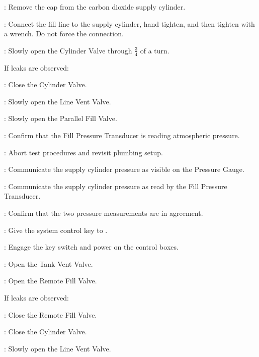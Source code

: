\begin{checklist}
    \item \primary: Remove the cap from the carbon dioxide supply cylinder.
    \item \primary: Connect the fill line to the supply cylinder, hand tighten, and then tighten with a wrench. Do not force the connection.
    \item \primary: Slowly open the Cylinder Valve through $\frac{3}{4}$ of a turn.
    \begin{checklist}[label=$\bullet$]
        \item If leaks are observed:
        \begin{checklist}
            \item \primary{}: Close the Cylinder Valve.
            \item \primary{}: Slowly open the Line Vent Valve.
            \item \primary{}: Slowly open the Parallel Fill Valve.
            \item \daq{}: Confirm that the Fill Pressure Transducer is reading atmospheric pressure.
            \item \ops{}: Abort test procedures and revisit plumbing setup.
        \end{checklist}
    \end{checklist}
    \item \primary: Communicate the supply cylinder pressure as visible on the Pressure Gauge.
    \item \daq: Communicate the supply cylinder pressure as read by the Fill Pressure Transducer.
    \item \daq: Confirm that the two pressure measurements are in agreement.
    \item \secondary: Give the system control key to \primary.
    \item \primary: Engage the key switch and power on the control boxes.
    \item \primary: Open the Tank Vent Valve.
    \item \primary: Open the Remote Fill Valve.
    \begin{checklist}[label=$\bullet$]
        \item If leaks are observed:
        \begin{checklist}
            \item \primary{}: Close the Remote Fill Valve.
            \item \primary{}: Close the Cylinder Valve.
            \item \primary{}: Slowly open the Line Vent Valve.

\end{checklist}
\end{checklist}
\end{checklist}
